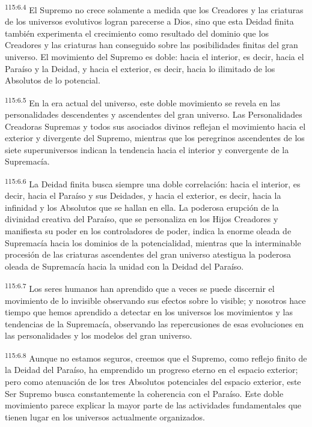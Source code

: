 \documentclass[twoside, 11pt]{book}
\begin{document}
\par
\textsuperscript{115:6.4} El Supremo no crece solamente a medida que los Creadores y las criaturas de los universos evolutivos logran parecerse a Dios, sino que esta Deidad finita también experimenta el crecimiento como resultado del dominio que los Creadores y las criaturas han conseguido sobre las posibilidades finitas del gran universo. El movimiento del Supremo es doble: hacia el interior, es decir, hacia el Paraíso y la Deidad, y hacia el exterior, es decir, hacia lo ilimitado de los Absolutos de lo potencial.

\par
\textsuperscript{115:6.5} En la era actual del universo, este doble movimiento se revela en las personalidades descendentes y ascendentes del gran universo. Las Personalidades Creadoras Supremas y todos sus asociados divinos reflejan el movimiento hacia el exterior y divergente del Supremo, mientras que los peregrinos ascendentes de los siete superuniversos indican la tendencia hacia el interior y convergente de la Supremacía.

\par
\textsuperscript{115:6.6} La Deidad finita busca siempre una doble correlación: hacia el interior, es decir, hacia el Paraíso y sus Deidades, y hacia el exterior, es decir, hacia la infinidad y los Absolutos que se hallan en ella. La poderosa erupción de la divinidad creativa del Paraíso, que se personaliza en los Hijos Creadores y manifiesta su poder en los controladores de poder, indica la enorme oleada de Supremacía hacia los dominios de la potencialidad, mientras que la interminable procesión de las criaturas ascendentes del gran universo atestigua la poderosa oleada de Supremacía hacia la unidad con la Deidad del Paraíso.

\par
\textsuperscript{115:6.7} Los seres humanos han aprendido que a veces se puede discernir el movimiento de lo invisible observando sus efectos sobre lo visible; y nosotros hace tiempo que hemos aprendido a detectar en los universos los movimientos y las tendencias de la Supremacía, observando las repercusiones de esas evoluciones en las personalidades y los modelos del gran universo.

\par
\textsuperscript{115:6.8} Aunque no estamos seguros, creemos que el Supremo, como reflejo finito de la Deidad del Paraíso, ha emprendido un progreso eterno en el espacio exterior; pero como atenuación de los tres Absolutos potenciales del espacio exterior, este Ser Supremo busca constantemente la coherencia con el Paraíso. Este doble movimiento parece explicar la mayor parte de las actividades fundamentales que tienen lugar en los universos actualmente organizados.
\end{document}
